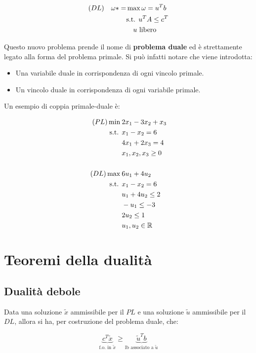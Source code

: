 \begin{align*}
		(DL) \quad \omega* = &\max \omega = u^T b \\
						&\text{s.t. } u^T A \leq c^T \\
						&\quad u \text{ libero}
\end{align*}

Questo nuovo problema prende il nome di \textbf{problema duale} ed è strettamente legato alla forma del problema primale.
Si può infatti notare che viene introdotta:

\begin{itemize}
	\item Una variabile duale in corrispondenza di ogni vincolo primale.
	\item Un vincolo duale in corrispondenza di ogni variabile primale.
\end{itemize}

Un esempio di coppia primale-duale è:


\begin{align*}
	(PL) \min\:& 2x_1 - 3x_2 +x_3 \\
	\text{s.t. }  & x_1 - x_2 = 6 \\
	 	 & 4x_1 +2 x_3 = 4 \\
	     & x_1, x_2, x_3 \geq 0 \\
	     &\\
	(DL) \max\:&6u_1 + 4u_2 \\
	     \text{s.t. }  & x_1 - x_2 = 6 \\
	     & u_1 + 4u_2 \leq 2 \\
	     & -u_1 \leq -3 \\
	     & 2u_2 \leq 1 \\
	     & u_1, u_2 \in \mathbb{R}
\end{align*}

\section{Teoremi della dualità}

\subsection{Dualità debole}

Data una soluzione $\tilde{x}$ ammissibile per il $PL$ e una soluzione $\tilde{u}$ ammissibile per il $DL$, allora si ha, per costruzione del problema duale, che:

$$
\underbrace{c^T \tilde{x}}_{\text{f.o. in }\tilde{x}} \geq \underbrace{\tilde{u}^T b}_{\text{lb associato a }\tilde{u}}
$$

